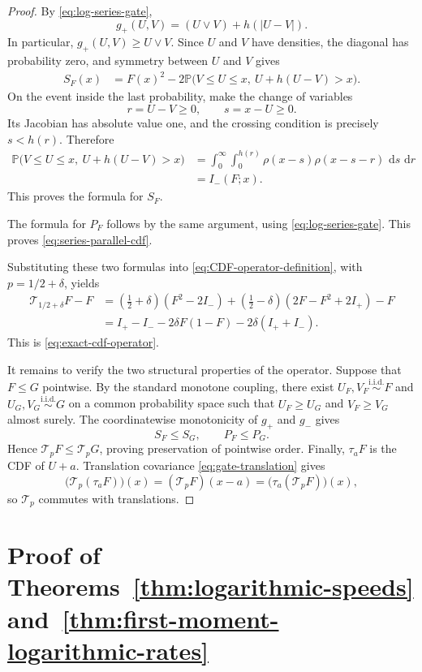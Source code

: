 \documentclass[12pt,preprint]{amsart}
\numberwithin{equation}{section}
\theoremstyle{plain}
\theoremstyle{definition}
\newcommand{\Pp}{\mathbb P}
\newcommand{\dd}{\,\mathrm d}
\begin{document}
\begin{proof}
By \eqref{eq:log-series-gate},
\[
 g_+(U,V)=(U\vee V)+h(|U-V|).
\]
In particular, $g_+(U,V)\ge U\vee V$.  Since $U$ and $V$ have densities,
the diagonal has probability zero, and
symmetry between $U$ and $V$ gives
\begin{align*}
 S_F(x)
 &=F(x)^2
   -2\Pp\bigl(V\le U\le x,\ U+h(U-V)>x\bigr).
\end{align*}
On the event inside the last probability, make the change of variables
\[
 r=U-V\ge0,
 \qquad
 s=x-U\ge0.
\]
Its Jacobian has absolute value one, and the crossing condition is precisely
$s<h(r)$.  Therefore
\[
\begin{aligned}
 \Pp\bigl(V\le U\le x,\ U+h(U-V)>x\bigr)
 &=\int_0^\infty\int_0^{h(r)}
   \rho(x-s)\rho(x-s-r)\,\dd s\,\dd r\\
 &=I_-(F;x).
\end{aligned}
\]
This proves the formula for $S_F$.

The formula for $P_F$ follows by the same argument, using
\eqref{eq:log-series-gate}.  This proves
\eqref{eq:series-parallel-cdf}.

Substituting these two formulas into
\eqref{eq:CDF-operator-definition}, with $p=1/2+\delta$, yields
\begin{align*}
 {\mathcal T_{1/2+\delta}F-F}
 &{=(\tfrac12+\delta)(F^2-2I_-)
   +(\tfrac12-\delta)(2F-F^2+2I_+)-F}\\
 &{=I_+-I_--2\delta F(1-F)-2\delta(I_++I_-).}
\end{align*}
This is \eqref{eq:exact-cdf-operator}.

It remains to verify the two structural properties of the operator.  Suppose
that $F\le G$ pointwise.  By the standard monotone coupling, there exist
$U_F,V_F\stackrel{\mathrm{i.i.d.}}{\sim}F$ and
$U_G,V_G\stackrel{\mathrm{i.i.d.}}{\sim}G$ on a common probability space such
that $U_F\ge U_G$ and $V_F\ge V_G$ almost surely.  The coordinatewise
monotonicity of $g_+$ and $g_-$ gives
\[
 S_F\le S_G,
 \qquad
 P_F\le P_G.
\]
Hence $\mathcal T_pF\le\mathcal T_pG$, proving preservation of pointwise
order.  Finally, $\tau_aF$ is the CDF of $U+a$.  Translation covariance
\eqref{eq:gate-translation} gives
\[
 \bigl(\mathcal T_p(\tau_aF)\bigr)(x)
 =(\mathcal T_pF)(x-a)
 =\bigl(\tau_a(\mathcal T_pF)\bigr)(x),
\]
so $\mathcal T_p$ commutes with translations.
\end{proof}

\section{Proof of Theorems~\ref{thm:logarithmic-speeds}
and~\ref{thm:first-moment-logarithmic-rates}}
\label{sec:ballistic-proof}
\end{document}
